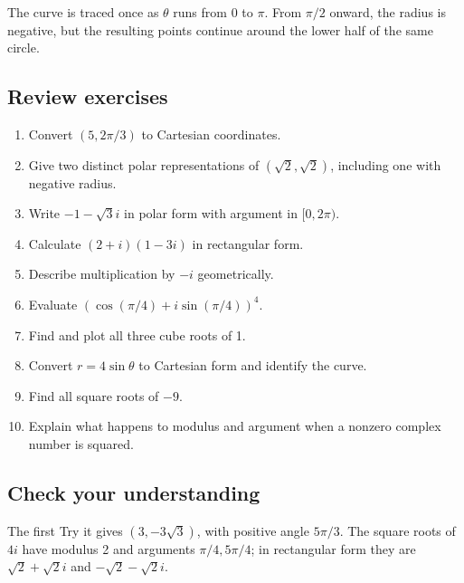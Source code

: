 The curve is traced once as \(\theta\) runs from 0 to \(\pi\). From \(\pi/2\) onward, the radius is negative, but the resulting points continue around the lower half of the same circle.

\hypertarget{m7-review-exercises}{%
\subsection{Review exercises}\label{m7-review-exercises}}

\begin{enumerate}
\def\labelenumi{\arabic{enumi}.}
\tightlist
\item
  Convert \((5,2\pi/3)\) to Cartesian coordinates.
\item
  Give two distinct polar representations of \((\sqrt2,\sqrt2)\), including one with negative radius.
\item
  Write \(-1-\sqrt3i\) in polar form with argument in \([0,2\pi)\).
\item
  Calculate \((2+i)(1-3i)\) in rectangular form.
\item
  Describe multiplication by \(-i\) geometrically.
\item
  Evaluate \((\cos(\pi/4)+i\sin(\pi/4))^4\).
\item
  Find and plot all three cube roots of 1.
\item
  Convert \(r=4\sin\theta\) to Cartesian form and identify the curve.
\item
  Find all square roots of \(-9\).
\item
  Explain what happens to modulus and argument when a nonzero complex number is squared.
\end{enumerate}

\hypertarget{m7-check-your-understanding}{%
\subsection{Check your understanding}\label{m7-check-your-understanding}}

The first Try it gives \((3,-3\sqrt3)\), with positive angle \(5\pi/3\). The square roots of \(4i\) have modulus 2 and arguments \(\pi/4,5\pi/4\); in rectangular form they are \(\sqrt2+\sqrt2i\) and \(-\sqrt2-\sqrt2i\).

\clearpage
